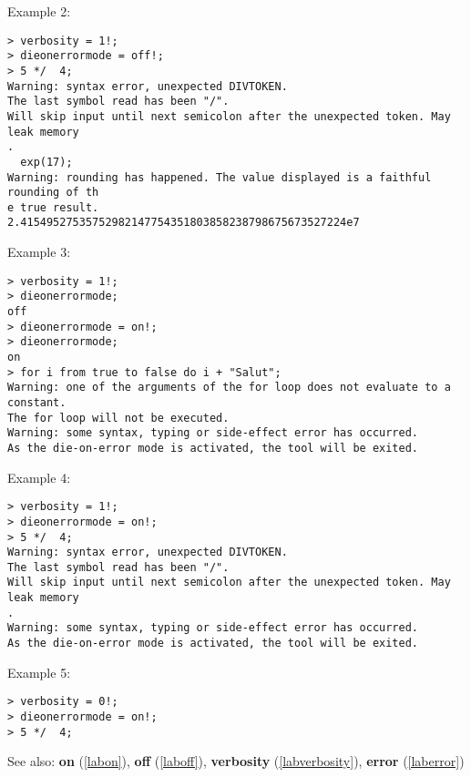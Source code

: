 \noindent Example 2: 
\begin{center}\begin{minipage}{15cm}\begin{Verbatim}[frame=single]
> verbosity = 1!;
> dieonerrormode = off!;
> 5 */  4;
Warning: syntax error, unexpected DIVTOKEN.
The last symbol read has been "/".
Will skip input until next semicolon after the unexpected token. May leak memory
.
  exp(17);
Warning: rounding has happened. The value displayed is a faithful rounding of th
e true result.
2.41549527535752982147754351803858238798675673527224e7
\end{Verbatim}
\end{minipage}\end{center}
\noindent Example 3: 
\begin{center}\begin{minipage}{15cm}\begin{Verbatim}[frame=single]
> verbosity = 1!;
> dieonerrormode;
off
> dieonerrormode = on!;
> dieonerrormode;
on
> for i from true to false do i + "Salut";
Warning: one of the arguments of the for loop does not evaluate to a constant.
The for loop will not be executed.
Warning: some syntax, typing or side-effect error has occurred.
As the die-on-error mode is activated, the tool will be exited.
\end{Verbatim}
\end{minipage}\end{center}
\noindent Example 4: 
\begin{center}\begin{minipage}{15cm}\begin{Verbatim}[frame=single]
> verbosity = 1!;
> dieonerrormode = on!;
> 5 */  4;
Warning: syntax error, unexpected DIVTOKEN.
The last symbol read has been "/".
Will skip input until next semicolon after the unexpected token. May leak memory
.
Warning: some syntax, typing or side-effect error has occurred.
As the die-on-error mode is activated, the tool will be exited.
\end{Verbatim}
\end{minipage}\end{center}
\noindent Example 5: 
\begin{center}\begin{minipage}{15cm}\begin{Verbatim}[frame=single]
> verbosity = 0!;
> dieonerrormode = on!;
> 5 */  4;
\end{Verbatim}
\end{minipage}\end{center}
See also: \textbf{on} (\ref{labon}), \textbf{off} (\ref{laboff}), \textbf{verbosity} (\ref{labverbosity}), \textbf{error} (\ref{laberror})
